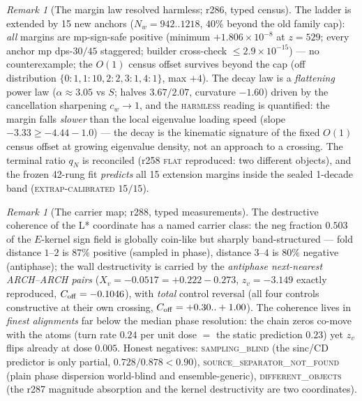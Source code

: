 \documentclass[11pt]{article}
\theoremstyle{definition}
\theoremstyle{remark}
\newtheorem{remark}[theorem]{Remark}
\begin{document}
\begin{remark}[The margin law resolved harmless; r286, typed
census]\label{rem:margin-law}
The ladder is extended by 15 new anchors ($N_w=942..1218$, $40\%$
beyond the old family cap): \emph{all} margins are mp-sign-safe
positive (minimum $+1.806\times10^{-8}$ at $z=529$; every anchor mp
dps-$30/45$ staggered; builder cross-check $\le2.9\times10^{-15}$) ---
no counterexample; the $O(1)$ census offset survives beyond the cap
(off distribution $\{0{:}1,1{:}10,2{:}2,3{:}1,4{:}1\}$, max $+4$).
The decay law is a \emph{flattening} power law ($\alpha\approx3.05$ vs
$S$; halves $3.67/2.07$, curvature $-1.60$) driven by the cancellation
sharpening $c_w\to1$, and the \textsc{harmless} reading is
quantified: the margin falls \emph{slower} than the local eigenvalue
loading speed (slope $-3.33\ge-4.44-1.0$) --- the decay is the
kinematic signature of the fixed $O(1)$ census offset at growing
eigenvalue density, not an approach to a crossing.  The terminal ratio
$q_N$ is reconciled (r258 \textsc{flat} reproduced: two different
objects), and the frozen 42-rung fit \emph{predicts} all 15 extension
margins inside the sealed 1-decade band
(\textsc{extrap-calibrated} $15/15$).
\end{remark}

\begin{remark}[The carrier map; r288, typed measurements]
\label{rem:carrier}
The destructive coherence of the L* coordinate has a named carrier
class: the neg fraction $0.503$ of the $E$-kernel sign field is
globally coin-like but sharply band-structured --- fold distance
$1$--$2$ is $87\%$ positive (sampled in phase), distance $3$--$4$ is
$80\%$ negative (antiphase); the wall destructivity is carried by the
\emph{antiphase next-nearest ARCH--ARCH pairs}
($X_v=-0.0517=+0.222-0.273$, $z_v=-3.149$ exactly reproduced,
$C_{\rm off}=-0.1046$), with \emph{total} control reversal (all four
controls constructive at their own crossing,
$C_{\rm off}=+0.30..+1.00$).  The coherence lives in \emph{finest
alignments} far below the median phase resolution: the chain zeros
co-move with the atoms (turn rate $0.24$ per unit dose $=$ the static
prediction $0.23$) yet $z_v$ flips already at dose $0.005$.  Honest
negatives: \textsc{sampling\_blind} (the sinc/CD predictor is only
partial, $0.728/0.878<0.90$), \textsc{source\_separator\_not\_found}
(plain phase dispersion world-blind and ensemble-generic),
\textsc{different\_objects} (the r287 magnitude absorption and the
kernel destructivity are two coordinates).
\end{remark}
\end{document}
